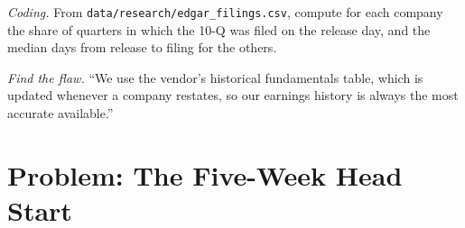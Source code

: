 \begin{exercise}[$\star\star\star$]\label{exo:rs:fundamental-analyst-and-event-features:7}
\emph{Coding.} From \texttt{data/research/edgar\_filings.csv}, compute for each company the share of quarters in which the 10-Q was filed on
the release day, and the median days from release to filing for the others.
\end{exercise}

\begin{exercise}[$\star\star\star$]\label{exo:rs:fundamental-analyst-and-event-features:8}
\emph{Find the flaw.} ``We use the vendor's historical fundamentals table, which is updated whenever a company restates, so our earnings
history is always the most accurate available.''
\end{exercise}

\section{Problem: The Five-Week Head Start}

